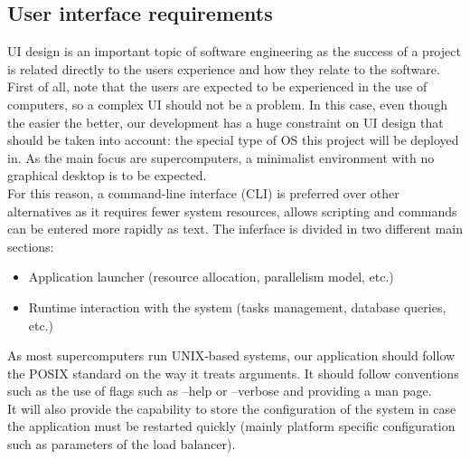 \subsection{User interface requirements}

UI design is an important topic of software engineering as the success of a
project is related directly to the users experience and how they relate to the
software.\\

First of all, note that the users are expected to be experienced in the use of
computers, so a complex UI should not be a problem. In this case, even though
the easier the better, our development has a huge constraint on UI design that
should be taken into account: the special type of OS this project
will be deployed in. As the main focus are supercomputers, a minimalist environment
with no graphical desktop is to be expected.\\

For this reason, a command-line interface (CLI) is preferred over other alternatives as it requires fewer system resources, allows scripting and commands can be entered more rapidly as text. 
The inferface is divided in two different  main sections:\\
\begin{itemize}
  \item Application launcher (resource allocation, parallelism model, etc.)
  \item Runtime interaction with the system (tasks management, database
  queries, etc.)
\end{itemize}

As most supercomputers run UNIX-based systems, our application should follow
the POSIX\cite{POSIX_arguments} standard on the way it treats arguments.
It should follow conventions such as the use of flags such as --help or
--verbose and providing a man page.\\

It will also provide the capability to store the configuration of the system in case
the application must be restarted quickly (mainly platform specific
configuration such as parameters of the load balancer). \\
